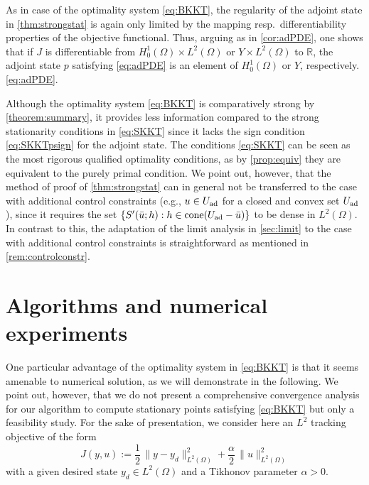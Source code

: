 \documentclass[reqno]{shinyart}
\begin{document}
\begin{remark}
    As in case of the optimality system \eqref{eq:BKKT}, the regularity of the adjoint state 
    in \cref{thm:strongstat} is again only limited by the mapping 
    resp.\ differentiability properties of the objective functional. 
    Thus, arguing as in \cref{cor:adPDE}, one shows that if $J$ is differentiable from $H^1_0(\Omega)\times L^2(\Omega)$ 
    or $Y\times L^2(\Omega)$ to ${\mathbb{R}}$, the adjoint state
    $p$ satisfying \eqref{eq:adPDE} is an element of 
    $H^1_0(\Omega)$ or $Y$, respectively.
    \eqref{eq:adPDE}.
\end{remark}

\begin{remark}
    Although the optimality system \eqref{eq:BKKT} is comparatively strong by 
    \cref{theorem:summary}, it provides less information compared to the strong 
    stationarity conditions in \eqref{eq:SKKT} since it lacks the sign condition \eqref{eq:SKKTpsign} for the adjoint state. The conditions \eqref{eq:SKKT} can be seen as the most rigorous 
    qualified optimality conditions, as by \cref{prop:equiv} they are equivalent to the purely primal condition. We point out, however, that the method of proof of  
    \cref{thm:strongstat} can in general not be transferred to the case with 
    additional control constraints (e.g., $u\in U_{\textup{ad}}$ 
    for a closed and convex set $U_{\textup{ad}}$), since it requires the set 
    $\{S'(\bar{u};h) : h \in \operatorname{cone}(U_\textup{ad} - \bar{u})\}$ to be dense in 
    $L^2(\Omega)$. In contrast to this, the adaptation of the limit analysis 
    in \cref{sec:limit} to the case with additional control constraints is
    straightforward as mentioned in \cref{rem:controlconstr}. 
\end{remark}

\section{Algorithms and numerical experiments}\label{sec:numerics}

One particular advantage of the optimality system in \eqref{eq:BKKT} is that it seems amenable to numerical solution, 
as we will demonstrate in the following. 
We point out, however, that we do not present a comprehensive convergence analysis for 
our algorithm to compute stationary points satisfying \eqref{eq:BKKT} but only 
a feasibility study.
For the sake of presentation, we consider here an $L^2$ tracking objective of the form
\begin{equation}\label{eq:tracking}
    J(y,u) := \frac{1}{2}\, \|y - y_d\|_{L^2(\Omega)}^2 + \frac{\alpha}{2}\,\|u\|_{L^2(\Omega)}^2
\end{equation}
with a given desired state $y_d \in L^2(\Omega)$ and a Tikhonov parameter $\alpha > 0$.
\end{document}
